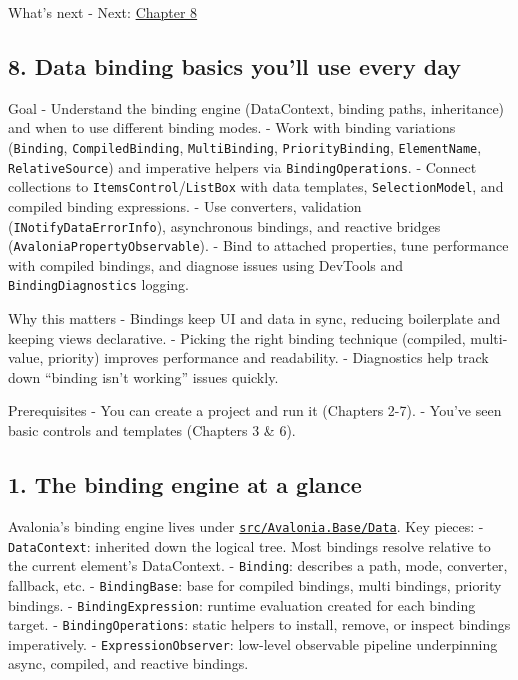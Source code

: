 What's next - Next: \href{Chapter08.md}{Chapter 8}

\newpage

\subsection{8. Data binding basics you'll use every
day}\label{data-binding-basics-youll-use-every-day}

Goal - Understand the binding engine (DataContext, binding paths,
inheritance) and when to use different binding modes. - Work with
binding variations (\passthrough{\lstinline!Binding!},
\passthrough{\lstinline!CompiledBinding!},
\passthrough{\lstinline!MultiBinding!},
\passthrough{\lstinline!PriorityBinding!},
\passthrough{\lstinline!ElementName!},
\passthrough{\lstinline!RelativeSource!}) and imperative helpers via
\passthrough{\lstinline!BindingOperations!}. - Connect collections to
\passthrough{\lstinline!ItemsControl!}/\passthrough{\lstinline!ListBox!}
with data templates, \passthrough{\lstinline!SelectionModel!}, and
compiled binding expressions. - Use converters, validation
(\passthrough{\lstinline!INotifyDataErrorInfo!}), asynchronous bindings,
and reactive bridges
(\passthrough{\lstinline!AvaloniaPropertyObservable!}). - Bind to
attached properties, tune performance with compiled bindings, and
diagnose issues using DevTools and
\passthrough{\lstinline!BindingDiagnostics!} logging.

Why this matters - Bindings keep UI and data in sync, reducing
boilerplate and keeping views declarative. - Picking the right binding
technique (compiled, multi-value, priority) improves performance and
readability. - Diagnostics help track down ``binding isn't working''
issues quickly.

Prerequisites - You can create a project and run it (Chapters 2-7). -
You've seen basic controls and templates (Chapters 3 \& 6).

\subsection{1. The binding engine at a
glance}\label{the-binding-engine-at-a-glance}

Avalonia's binding engine lives under
\href{https://github.com/AvaloniaUI/Avalonia/tree/master/src/Avalonia.Base/Data}{\passthrough{\lstinline!src/Avalonia.Base/Data!}}.
Key pieces: - \passthrough{\lstinline!DataContext!}: inherited down the
logical tree. Most bindings resolve relative to the current element's
DataContext. - \passthrough{\lstinline!Binding!}: describes a path,
mode, converter, fallback, etc. - \passthrough{\lstinline!BindingBase!}:
base for compiled bindings, multi bindings, priority bindings. -
\passthrough{\lstinline!BindingExpression!}: runtime evaluation created
for each binding target. - \passthrough{\lstinline!BindingOperations!}:
static helpers to install, remove, or inspect bindings imperatively. -
\passthrough{\lstinline!ExpressionObserver!}: low-level observable
pipeline underpinning async, compiled, and reactive bindings.

